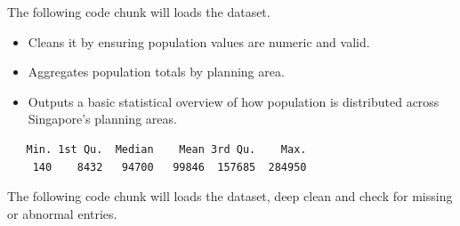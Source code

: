 \documentclass[
  letterpaper,
  DIV=11,
  numbers=noendperiod]{scrartcl}
\newenvironment{Shaded}{\begin{snugshade}}{\end{snugshade}}
\newcommand{\AttributeTok}[1]{\textcolor[rgb]{0.40,0.45,0.13}{#1}}
\newcommand{\CommentTok}[1]{\textcolor[rgb]{0.37,0.37,0.37}{#1}}
\newcommand{\ConstantTok}[1]{\textcolor[rgb]{0.56,0.35,0.01}{#1}}
\newcommand{\DecValTok}[1]{\textcolor[rgb]{0.68,0.00,0.00}{#1}}
\newcommand{\FunctionTok}[1]{\textcolor[rgb]{0.28,0.35,0.67}{#1}}
\newcommand{\NormalTok}[1]{\textcolor[rgb]{0.00,0.23,0.31}{#1}}
\newcommand{\OtherTok}[1]{\textcolor[rgb]{0.00,0.23,0.31}{#1}}
\newcommand{\SpecialCharTok}[1]{\textcolor[rgb]{0.37,0.37,0.37}{#1}}
\newcommand{\StringTok}[1]{\textcolor[rgb]{0.13,0.47,0.30}{#1}}
\begin{document}
The following code chunk will loads the dataset.

\begin{itemize}
\item
  Cleans it by ensuring population values are numeric and valid.
\item
  Aggregates population totals by planning area.
\item
  Outputs a basic statistical overview of how population is distributed
  across Singapore's planning areas.
\end{itemize}

\begin{Shaded}
\end{Shaded}

\begin{verbatim}
   Min. 1st Qu.  Median    Mean 3rd Qu.    Max. 
    140    8432   94700   99846  157685  284950 
\end{verbatim}

The following code chunk will loads the dataset, deep clean and check
for missing or abnormal entries.
\end{document}
